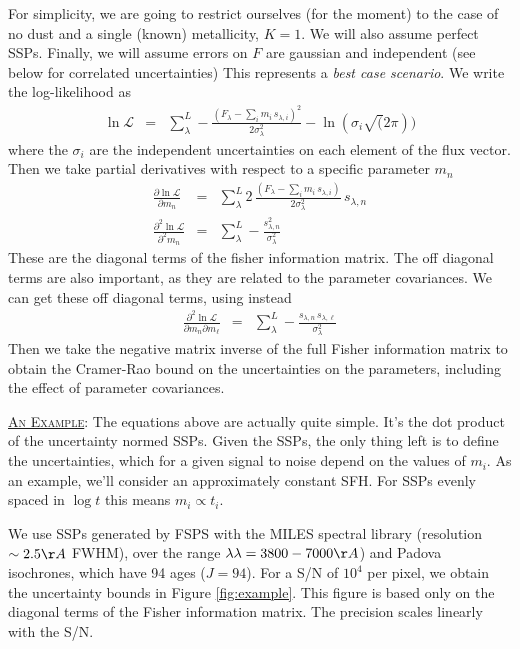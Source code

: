\documentclass{article}
\begin{document}
For simplicity, we are going to restrict ourselves (for the moment) to the case of no dust and a single (known) metallicity, $K=1$.
We will also assume perfect SSPs.
Finally, we will assume errors on $F$ are gaussian and independent (see below for correlated uncertainties)
This represents a \emph{best case scenario}.
We write the log-likelihood as
\begin{eqnarray}
\ln \mathcal{L} & = & \sum^L_\lambda -\frac{(F_\lambda - \sum_i m_i \, s_{\lambda, i})^2}{2 \sigma_\lambda^2} - \ln(\sigma_i\sqrt(2\pi))
\end{eqnarray}
where the $\sigma_i$ are the independent uncertainties on each element of the flux vector.
Then we take partial derivatives with respect to a specific parameter $m_n$
\begin{eqnarray}
\frac{\partial \ln \mathcal{L}}{\partial m_n} & = & \sum^L_\lambda  2 \, \frac{(F_\lambda - \sum_i m_i \, s_{\lambda, i})}{2 \sigma_\lambda^2} \, s_{\lambda, n} \\
\frac{\partial^2 \ln \mathcal{L}}{\partial^2 m_n} & = & \sum^L_\lambda -\frac{s_{\lambda, n}^2}{\sigma_\lambda^2} 
\end{eqnarray}
These are the diagonal terms of the fisher information matrix.  The off diagonal terms are also important, as they are related to the parameter covariances. We can get these off diagonal terms, using instead
\begin{eqnarray}
\frac{\partial^2 \ln \mathcal{L}}{\partial m_n \partial m_\ell} & = & \sum^L_\lambda -\frac{s_{\lambda, n}\, s_{\lambda, \ell}}{\sigma_\lambda^2} 
\end{eqnarray}
Then we take the negative matrix inverse of the full Fisher information matrix to obtain the Cramer-Rao bound on the uncertainties on the parameters, including the effect of parameter covariances.


\underline{\textsc{An Example}}:  
The equations above are actually quite simple.  
It's the dot product of the uncertainty normed SSPs. 
Given the SSPs, the only thing left is to define the uncertainties, which for a given signal to noise depend on the values of $m_i$.  
As an example, we'll consider an approximately constant SFH.  For SSPs evenly spaced in $\log t$ this means $m_i \propto t_i$.

We use SSPs generated by FSPS with 
the MILES spectral library (resolution $\sim 2.5\AA$ FWHM), over the range $\lambda\lambda = 3800-7000\AA$) and 
Padova isochrones, which have 94 ages ($J=94$).
For a S/N of $10^4$ per pixel, we obtain the uncertainty bounds in Figure \ref{fig:example}.
This figure is based only on the diagonal terms of the Fisher information matrix.
The precision scales linearly with the S/N.
\end{document}
